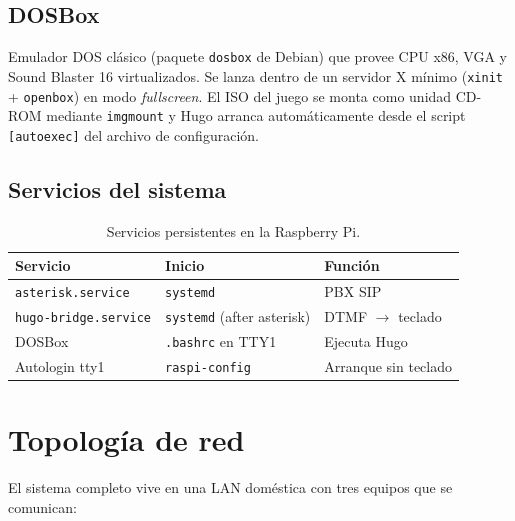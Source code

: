 \subsection{DOSBox}

Emulador DOS clásico (paquete \texttt{dosbox} de Debian) que provee CPU x86, VGA y Sound Blaster 16 virtualizados. Se lanza dentro de un servidor X mínimo (\texttt{xinit} + \texttt{openbox}) en modo \emph{fullscreen}. El ISO del juego se monta como unidad CD-ROM mediante \texttt{imgmount} y Hugo arranca automáticamente desde el script \texttt{[autoexec]} del archivo de configuración.

\subsection{Servicios del sistema}

\begin{table}[h]
\centering
\begin{tabular}{lll}
\toprule
\textbf{Servicio} & \textbf{Inicio} & \textbf{Función} \\
\midrule
\texttt{asterisk.service} & \texttt{systemd} & PBX SIP \\
\texttt{hugo-bridge.service} & \texttt{systemd} (after asterisk) & DTMF $\to$ teclado \\
DOSBox & \texttt{.bashrc} en TTY1 & Ejecuta Hugo \\
Autologin tty1 & \texttt{raspi-config} & Arranque sin teclado \\
\bottomrule
\end{tabular}
\caption{Servicios persistentes en la Raspberry Pi.}
\end{table}

\section{Topología de red}

El sistema completo vive en una LAN doméstica con tres equipos que se comunican:

\begin{center}
\end{center}

